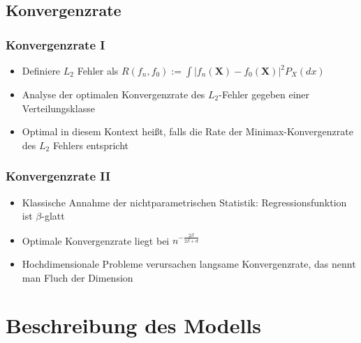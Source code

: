 \documentclass[hyperref={pdfpagelabels=false}]{beamer}
\begin{document}
\subsection{Konvergenzrate}
\begin{frame}
\frametitle{Konvergenzrate \RN{1}}
\begin{itemize}
\item Definiere $L_2$ Fehler als $R( f_n, f_0) := \int \vert f_n(\mathbf{X})-f_0(\mathbf{X})\vert ^2 P _X(dx)$
\item Analyse der optimalen Konvergenzrate des $L_2$-Fehler gegeben einer Verteilungsklasse
\item Optimal in diesem Kontext heißt, falls die Rate der Minimax-Konvergenzrate des $L_2$ Fehlers entspricht
\end{itemize}
\end{frame}

\theoremstyle{equation}
\newtheorem{def2}{Definition}


\begin{frame}
\frametitle{Konvergenzrate \RN{2}}
\begin{itemize}
\item Klassische Annahme der nichtparametrischen Statistik: Regressionsfunktion ist $\beta$-glatt
\item Optimale Konvergenzrate liegt bei $n^{-\frac{2\beta}{2\beta+d}}$	
\item Hochdimensionale Probleme verursachen langsame Konvergenzrate, das nennt man Fluch der Dimension
\end{itemize}
\end{frame}

\section{Beschreibung des Modells} 
\end{document}

